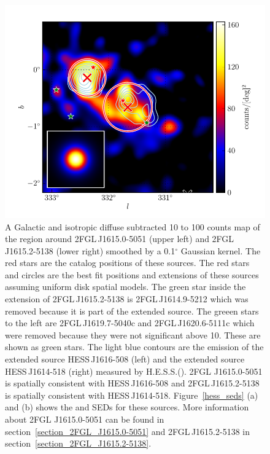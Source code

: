 \documentclass[12pt,preprint]{aastex}
\newcommand{\gev}{\text{GeV}\xspace}
\newcommand{\tev}{\text{TeV}\xspace}
\renewcommand{\deg}{\ensuremath{^\circ}\xspace}
\begin{document}
\begin{figure}
  \begin{center}
    \includegraphics[type=pdf,ext=.pdf,read=.pdf]{source_plots/source_1FGL_J1613.6-5100c}
  \end{center}
  \caption{
    A Galactic and isotropic diffuse subtracted 10 \gev to 100
    \gev counts map of the region around 2FGL\,J1615.0-5051 (upper
    left) and 2FGL\,J1615.2-5138 (lower right) smoothed by a 0.1\deg
    Gaussian kernel.  The red stars are the catalog positions of these
    sources.  The red stars and circles are the best fit positions and
    extensions of these sources assuming uniform disk spatial models.
    The green star inside the extension of 2FGL\,J1615.2-5138  is
    2FGL\,J1614.9-5212 which was removed because it is part of the
    extended source.  The greeen stars to the left are 2FGL\,J1619.7-5040c
    and 2FGL\,J1620.6-5111c which were removed because they were
    not significant above 10\gev. These are shown as green stars.
    The light blue contours are the \tev emission of the extended source
    HESS\,J1616-508 (left) and the extended source HESS\,J1614-518
    (right) measured by H.E.S.S.(\cite{hess_plane_survey}). 2FGL
    J1615.0-5051 is spatially consistent with HESS\,J1616-508 and
    2FGL\,J1615.2-5138 is spatially consistent with HESS\,J1614-518.
    Figure~\ref{hess_seds} (a) and (b) shows the \gev and \tev SEDs for
    these sources.
    More information about 2FGL J1615.0-5051 can be found in
    section~\ref{section_2FGL_J1615.0-5051} and 2FGL\,J1615.2-5138 in
    section~\ref{section_2FGL_J1615.2-5138}.
  }\label{1FGL_J1613.6-5100c}
\end{figure}
\end{document}

